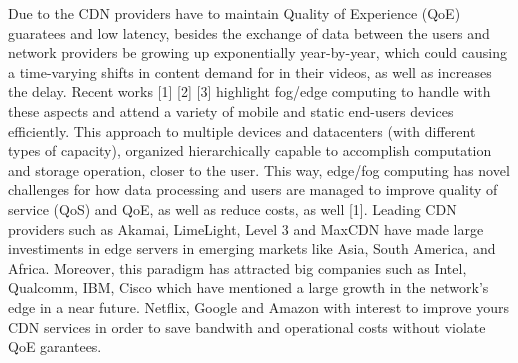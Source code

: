 Due to the CDN providers have to maintain Quality of Experience (QoE) guaratees and low latency, besides the exchange of data between the users and network providers be growing up exponentially year-by-year, which could causing a time-varying shifts in content demand for in their videos, as well as increases the delay. Recent works [1] [2] [3] highlight fog/edge computing to handle with these aspects and attend a variety of mobile and static end-users devices efficiently. 
This approach to multiple devices and datacenters (with different types of capacity), organized hierarchically capable to accomplish computation and storage operation,  closer to the user. This way, edge/fog computing has novel challenges for how data processing and users are managed to improve quality of service (QoS) and QoE, as well as reduce costs, as well [1]. 
Leading CDN providers such as Akamai, LimeLight, Level 3 and MaxCDN have made large investiments in edge servers in emerging markets like Asia, South America, and Africa.
Moreover, this paradigm has attracted big companies such as Intel, Qualcomm, IBM, Cisco which have mentioned a large growth in the network's edge in a near future.
Netflix, Google and Amazon with interest to improve yours CDN services in order to save bandwith and operational costs without violate QoE garantees. %



